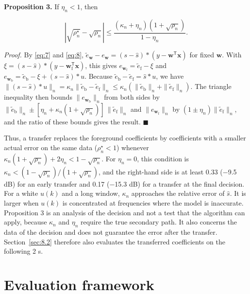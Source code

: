 \documentclass[sip,biber]{now-journal}
\begin{document}
\textbf{Proposition 3.} If \(\eta_n < 1\), then

\[\left| \sqrt{\rho^{\star}_n} - \sqrt{\rho_n} \right| \le \frac{(\kappa_n + \eta_n)\left( 1 + \sqrt{\rho_n} \right)}{1 - \eta_n}.\]

\emph{Proof.} By \eqref{eq:7} and \eqref{eq:8}, \(\tilde{e}_{\mathbf{w}} - e_{\mathbf{w}} = (s - \hat{s}) * (y - \mathbf{w}^{\mathsf T}\mathbf{x})\) for fixed \(\mathbf{w}\). With \(\xi = (s - \hat{s}) * (y - \mathbf{w}_{\mathrm f}^{\mathsf T}\mathbf{x})\), this gives \(e_{\mathbf{w}_{\mathrm f}} = \tilde{e}_{\mathrm f} - \xi\) and \(e_{\mathbf{w}_{\mathrm b}} = \tilde{e}_{\mathrm b} - \xi + (s - \hat{s}) * u\). Because \(\tilde{e}_{\mathrm b} - \tilde{e}_{\mathrm f} = \hat{s} * u\), we have \(\|(s - \hat{s}) * u\|_n = \kappa_n \|\tilde{e}_{\mathrm b} - \tilde{e}_{\mathrm f}\|_n \le \kappa_n (\|\tilde{e}_{\mathrm b}\|_n + \|\tilde{e}_{\mathrm f}\|_n)\). The triangle inequality then bounds \(\|e_{\mathbf{w}_{\mathrm b}}\|_n\) from both sides by \(\|\tilde{e}_{\mathrm b}\|_n \pm [\eta_n + \kappa_n(1 + \sqrt{\rho_n})]\,\|\tilde{e}_{\mathrm f}\|_n\) and \(\|e_{\mathbf{w}_{\mathrm f}}\|_n\) by \((1 \pm \eta_n)\|\tilde{e}_{\mathrm f}\|_n\), and the ratio of these bounds gives the result. \(\blacksquare\)

Thus, a transfer replaces the foreground coefficients by coefficients with a smaller actual error on the same data (\(\rho^{\star}_n < 1\)) whenever \(\kappa_n (1 + \sqrt{\rho_n}) + 2\eta_n < 1 - \sqrt{\rho_n}\). For \(\eta_n = 0\), this condition is \(\kappa_n < (1 - \sqrt{\rho_n})/(1 + \sqrt{\rho_n})\), and the right-hand side is at least 0.33 (−9.5 dB) for an early transfer and 0.17 (−15.3 dB) for a transfer at the final decision. For a white \(u(k)\) and a long window, \(\kappa_n\) approaches the relative error of \(\hat{s}\). It is larger when \(u(k)\) is concentrated at frequencies where the model is inaccurate. Proposition 3 is an analysis of the decision and not a test that the algorithm can apply, because \(\kappa_n\) and \(\eta_n\) require the true secondary path. It also concerns the data of the decision and does not guarantee the error after the transfer. Section~\ref{sec:8.2} therefore also evaluates the transferred coefficients on the following 2 s.

\hypertarget{sec:5}{%
\section{Evaluation framework}\label{sec:5}}
\end{document}
